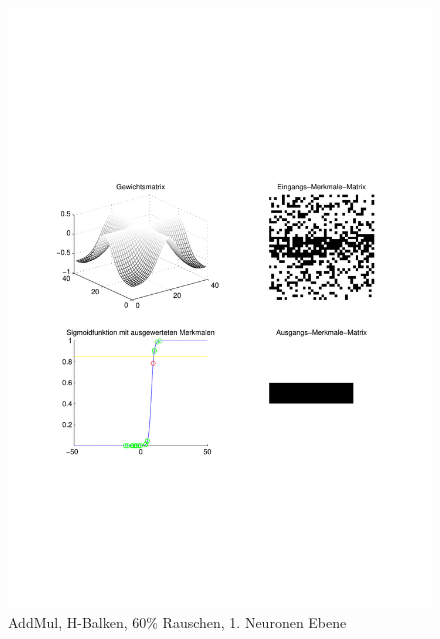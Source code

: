 \begin{figure}[hbt]
	\begin{minipage}{0.8 \textwidth}
		\includegraphics[width=\textwidth]{./Bilder/Auswertung/Endergebnis/TypeAddMul_Rauschen60_H_Line_Layer1}
		\caption{AddMul, H-Balken, 60\% Rauschen, 1. Neuronen Ebene}
		\label{AddMul_H_60_1}
	\end{minipage}
	\vfill
	\begin{minipage}{0.8 \textwidth}

\end{minipage}
\end{figure}
